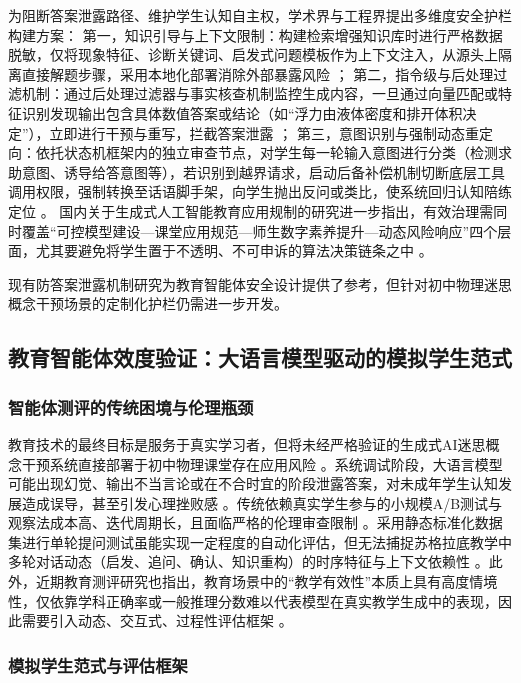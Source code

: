 为阻断答案泄露路径、维护学生认知自主权，学术界与工程界提出多维度安全护栏构建方案：
第一，知识引导与上下文限制：构建检索增强知识库时进行严格数据脱敏，仅将现象特征、诊断关键词、启发式问题模板作为上下文注入，从源头上隔离直接解题步骤，采用本地化部署消除外部暴露风险 \citep{ref20}；
第二，指令级与后处理过滤机制：通过后处理过滤器与事实核查机制监控生成内容，一旦通过向量匹配或特征识别发现输出包含具体数值答案或结论（如“浮力由液体密度和排开体积决定”），立即进行干预与重写，拦截答案泄露 \citep{ref20}；
第三，意图识别与强制动态重定向：依托状态机框架内的独立审查节点，对学生每一轮输入意图进行分类（检测求助意图、诱导给答意图等），若识别到越界请求，启动后备补偿机制切断底层工具调用权限，强制转换至话语脚手架，向学生抛出反问或类比，使系统回归认知陪练定位 \citep{ref20}。
国内关于生成式人工智能教育应用规制的研究进一步指出，有效治理需同时覆盖“可控模型建设—课堂应用规范—师生数字素养提升—动态风险响应”四个层面，尤其要避免将学生置于不透明、不可申诉的算法决策链条之中 \citep{zhengyonghong2024regulation,tupingrong2026ethics}。

现有防答案泄露机制研究为教育智能体安全设计提供了参考，但针对初中物理迷思概念干预场景的定制化护栏仍需进一步开发。

\subsection{教育智能体效度验证：大语言模型驱动的模拟学生范式}

\subsubsection{智能体测评的传统困境与伦理瓶颈}

教育技术的最终目标是服务于真实学习者，但将未经严格验证的生成式AI迷思概念干预系统直接部署于初中物理课堂存在应用风险 \citep{ref14}。系统调试阶段，大语言模型可能出现幻觉、输出不当言论或在不合时宜的阶段泄露答案，对未成年学生认知发展造成误导，甚至引发心理挫败感 \citep{ref14}。传统依赖真实学生参与的小规模A/B测试与观察法成本高、迭代周期长，且面临严格的伦理审查限制 \citep{ref39}。采用静态标准化数据集进行单轮提问测试虽能实现一定程度的自动化评估，但无法捕捉苏格拉底教学中多轮对话动态（启发、追问、确认、知识重构）的时序特征与上下文依赖性 \citep{ref18}。此外，近期教育测评研究也指出，教育场景中的“教学有效性”本质上具有高度情境性，仅依靠学科正确率或一般推理分数难以代表模型在真实教学生成中的表现，因此需要引入动态、交互式、过程性评估框架 \citep{shi2025educationq,weib2025elmes}。

\subsubsection{模拟学生范式与评估框架}

